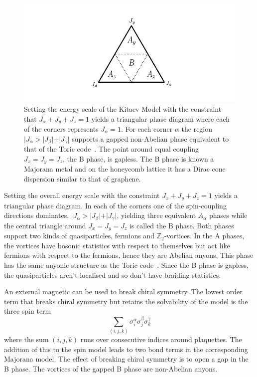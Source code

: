 \hypertarget{fig:KH_phase_diagram}{%
\begin{figure}
\centering
\includegraphics[width=1\textwidth,height=\textheight]{figure_code/background_chapter/KH_phase_diagram}
\caption[{Kitaev Honeycomb Model Phase Diagram}]{Setting the energy scale of the Kitaev Model with the constraint that \(J_x + J_y + J_z = 1\) yields a triangular phase diagram where each of the corners represents \(J_\alpha = 1\). For each corner \(\alpha\) the region \(|J_\alpha > |J_\beta| + |J_\gamma|\) supports a gapped non-Abelian phase equivalent to that of the Toric code~\autocite{kitaev1997quantum,kitaev_fault-tolerant_2003}. The point around equal coupling \(J_x = J_y = J_z\), the B phase, is gapless. The B phase is known a Majorana metal and on the honeycomb lattice it has a Dirac cone dispersion similar to that of graphene.}
\label{fig:KH_phase_diagram}
\end{figure}
}

Setting the overall energy scale with the constraint \(J_x + J_y + J_z = 1\) yields a triangular phase diagram. In each of the corners one of the spin-coupling directions dominates, \(|J_\alpha > |J_\beta| + |J_\gamma|\), yielding three equivalent \(A_\alpha\) phases while the central triangle around \(J_x = J_y = J_z\) is called the B phase. Both phases support two kinds of quasiparticles, fermions and \(\mathbb{Z}_2\)-vortices. In the A phases, the vortices have bosonic statistics with respect to themselves but act like fermions with respect to the fermions, hence they are Abelian anyons, This phase has the same anyonic structure as the Toric code~\autocite{kitaev_fault-tolerant_2003}. Since the B phase is gapless, the quasiparticles aren't localised and so don't have braiding statistics.

An external magnetic can be used to break chiral symmetry. The lowest order term that breaks chiral symmetry but retains the solvability of the model is the three spin term \[
\sum_{(i,j,k)} \sigma_i^{\alpha} \sigma_j^{\beta} \sigma_k^{\gamma}
\] where the sum \((i,j,k)\) runs over consecutive indices around plaquettes. The addition of this to the spin model leads to two bond terms in the corresponding Majorana model. The effect of breaking chiral symmetry is to open a gap in the B phase. The vortices of the gapped B phase are non-Abelian anyons.

